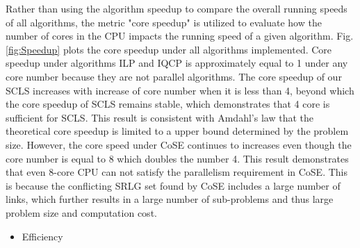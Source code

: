 Rather than using the algorithm speedup to compare the overall running speeds of all algorithms, the metric "core speedup" is utilized to evaluate how the number of cores in the CPU impacts the running speed of a given algorithm.
Fig.\ref{fig:Speedup} plots the core speedup under all algorithms implemented.
Core speedup under algorithms ILP and IQCP is  approximately equal to 1 under any core number because they are not parallel algorithms. The core speedup of our SCLS increases with increase of core number when it is less than 4, beyond which the core speedup of SCLS remains stable, which demonstrates that 4 core is sufficient for SCLS. This result is consistent with Amdahl's law \cite{amdahl1967validity} that the theoretical core speedup is limited to a upper bound determined by the problem size. However, the core speed under CoSE continues to increases even though the core number is  equal to 8 which doubles the number 4. This result demonstrates that even 8-core CPU can not satisfy the parallelism requirement in CoSE. This is because the conflicting SRLG set found by CoSE includes  a large number of links,  which further results in a large number of sub-problems  and thus large problem size and  computation cost.


%

\begin{itemize}
  \item Efficiency
\end{itemize}


